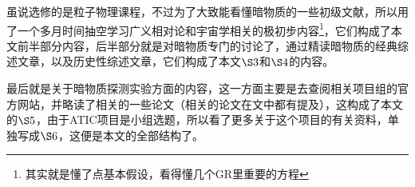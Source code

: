 \documentclass{ctexart}
\begin{document}
	虽说选修的是粒子物理课程，不过为了大致能看懂暗物质的一些初级文献，所以用了一个多月时间抽空学习广义相对论和宇宙学相关的极初步内容\footnote{其实就是懂了点基本假设，看得懂几个GR里重要的方程}，它们构成了本文前半部分内容，后半部分就是对暗物质专门的讨论了，通过精读暗物质的经典综述文章\cite{RN32}，以及历史性综述文章\cite{RevModPhys.90.045002}，它们构成了本文$\S3$和$\S4$的内容。
	
	最后就是关于暗物质探测实验方面的内容，这一方面主要是去查阅相关项目组的官方网站，并略读了相关的一些论文（相关的论文在文中都有提及），这构成了本文的$\S 5$，由于ATIC项目是小组选题，所以看了更多关于这个项目的有关资料，单独写成$\S 6$，这便是本文的全部结构了。
	
	
	
	\nocite{*}
	
\end{document}
